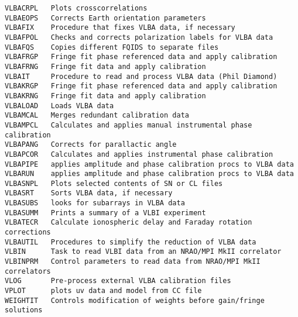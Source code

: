 \begin{verbatim}
VLBACRPL   Plots crosscorrelations
VLBAEOPS   Corrects Earth orientation parameters
VLBAFIX    Procedure that fixes VLBA data, if necessary
VLBAFPOL   Checks and corrects polarization labels for VLBA data
VLBAFQS    Copies different FQIDS to separate files
VLBAFRGP   Fringe fit phase referenced data and apply calibration
VLBAFRNG   Fringe fit data and apply calibration
VLBAIT     Procedure to read and process VLBA data (Phil Diamond)
VLBAKRGP   Fringe fit phase referenced data and apply calibration
VLBAKRNG   Fringe fit data and apply calibration
VLBALOAD   Loads VLBA data
VLBAMCAL   Merges redundant calibration data
VLBAMPCL   Calculates and applies manual instrumental phase calibration
VLBAPANG   Corrects for parallactic angle
VLBAPCOR   Calculates and applies instrumental phase calibration
VLBAPIPE   applies amplitude and phase calibration procs to VLBA data
VLBARUN    applies amplitude and phase calibration procs to VLBA data
VLBASNPL   Plots selected contents of SN or CL files
VLBASRT    Sorts VLBA data, if necessary
VLBASUBS   looks for subarrays in VLBA data
VLBASUMM   Prints a summary of a VLBI experiment
VLBATECR   Calculate ionospheric delay and Faraday rotation corrections
VLBAUTIL   Procedures to simplify the reduction of VLBA data
VLBIN      Task to read VLBI data from an NRAO/MPI MkII correlator
VLBINPRM   Control parameters to read data from NRAO/MPI MkII correlators
VLOG       Pre-process external VLBA calibration files
VPLOT      plots uv data and model from CC file
WEIGHTIT   Controls modification of weights before gain/fringe solutions
\end{verbatim}\eve

\normalsize



\bre
{}
\ere
\vfill\eject


